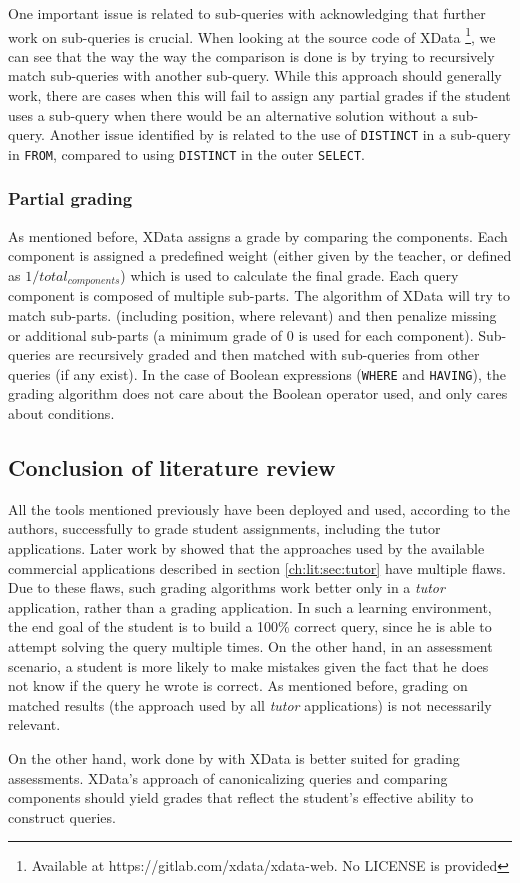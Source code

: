 One important issue is related to sub-queries with \cite{literature:xdata} acknowledging that further work on sub-queries is crucial. When looking at the source code of XData \footnote{Available at https://gitlab.com/xdata/xdata-web. No LICENSE is provided}, we can see that the way the way the comparison is done is by trying to recursively match sub-queries with another sub-query. While this approach should generally work, there are cases when this will fail to assign any partial grades if the student uses a sub-query when there would be an alternative solution without a sub-query. Another issue identified by \cite{literature:xdata} is related to the use of \texttt{DISTINCT} in a sub-query in \texttt{FROM}, compared to using \texttt{DISTINCT} in the outer \texttt{SELECT}.

\subsubsection{Partial grading}

As mentioned before, XData assigns a grade by comparing the components. Each component is assigned a predefined weight (either given by the teacher, or defined as $1 / total_{components}$) which is used to calculate the final grade. Each query component is composed of multiple sub-parts. The algorithm of XData will try to match sub-parts. (including position, where relevant) and then penalize missing or additional sub-parts (a minimum grade of 0 is used for each component). Sub-queries are recursively graded and then matched with sub-queries from other queries (if any exist). In the case of Boolean expressions (\texttt{WHERE} and \texttt{HAVING}), the grading algorithm does not care about the Boolean operator used, and only cares about conditions.

\subsection{Conclusion of literature review}

All the tools mentioned previously have been deployed and used, according to the authors, successfully to grade student assignments, including the tutor applications. Later work by \cite{literature:xdata} showed that the approaches used by the available commercial applications described in section \ref{ch:lit:sec:tutor} have multiple flaws. Due to these flaws, such grading algorithms work better only in a \textit{tutor} application, rather than a grading application. In such a learning environment, the end goal of the student is to build a 100\% correct query, since he is able to attempt solving the query multiple times. On the other hand, in an assessment scenario, a student is more likely to make mistakes given the fact that he does not know if the query he wrote is correct. As mentioned before, grading on matched results (the approach used by all \textit{tutor} applications) is not necessarily relevant.

On the other hand, work done by \cite{literature:xdata} with XData is better suited for grading assessments. XData's approach of canonicalizing queries and comparing components should yield grades that reflect the student's effective ability to construct queries.

